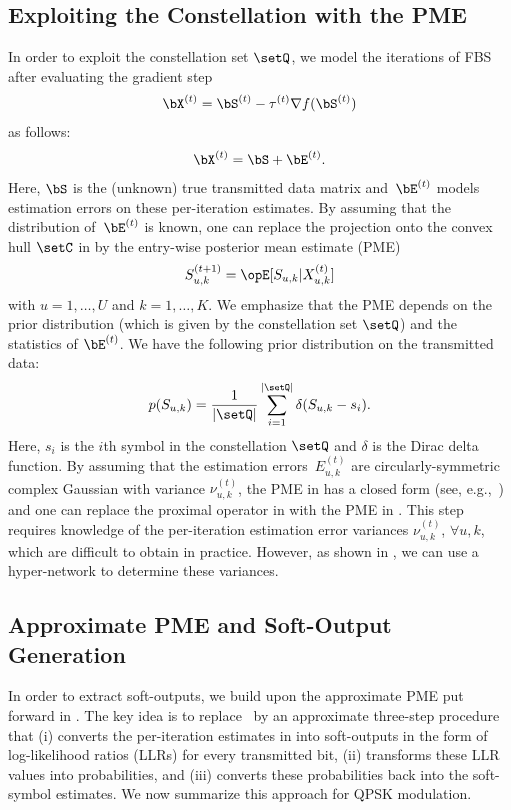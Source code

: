 \subsection{Exploiting the Constellation with the PME}\label{sec:posterior mean}
%
In order to exploit the constellation set $\setQ$, we model the iterations of FBS after evaluating the gradient step  
\begin{align} \label{eq:gradientstep}
\bX^{(t)} = \bS^{ (t) }- \tau^{(t)} \nabla f( \bS^{ (t) })
\end{align}
as follows: 
\begin{align}\label{eq:post equalized additive model}
\bX^{(t)}= \bS + \bE^{(t)}.
\end{align}
Here, $\bS$ is the (unknown) true transmitted data matrix and~$\bE^{(t)}$ models estimation errors on these per-iteration estimates. By assuming that the distribution of~$\bE^{(t)}$ is known, one can replace the projection onto the convex hull $\setC$ in  by the entry-wise posterior mean estimate (PME)
\begin{align} \label{eq:PME}
S_{u,k}^{(t+1)} = \Exop[ S_{u,k}| X_{u,k}^{(t)}]
\end{align}
with $u=1,\ldots,U$ and $k=1,\ldots,K$. We emphasize that the PME depends on the prior distribution (which is given by the constellation set $\setQ$) and the statistics of $\bE^{(t)}$. 
%
We have the following prior distribution on the transmitted data:
\begin{align}
p(S_{u,k}) = \frac{1}{|\setQ|}\sum_{i=1}^{|\setQ|} \delta(S_{u,k}-s_i).
\end{align}
Here, $s_i$ is the $i$th symbol in the constellation $\setQ$ and $\delta$ is the Dirac delta function. 
%
By assuming that the estimation errors~$E^{(t)}_{u,k}$ are circularly-symmetric complex Gaussian with variance $\nu_{u,k}^{(t)}$, the PME in  has a closed form (see, e.g.,~\cite{jeonOptimality2015}) and one can replace the proximal operator in  with the PME in .
%
This step requires knowledge of the per-iteration estimation error variances $\nu_{u,k}^{(t)}$, $\forall u,k$, which are difficult to obtain in practice. However, as shown in , we can use a hyper-network to determine these variances. 


\subsection{Approximate PME and Soft-Output Generation}
\label{sec:approxsoftoutputtrick}
%
In order to extract soft-outputs, we build upon the approximate PME put forward in \cite{jeonMismatched2020,jeon3542019}. 
%
The key idea is to replace~ by an approximate three-step procedure that (i) converts the per-iteration estimates in  into soft-outputs in the form of log-likelihood ratios (LLRs) for every transmitted bit, (ii) transforms these LLR values into probabilities, and (iii) converts these probabilities back into the soft-symbol estimates. 
%
We now summarize this approach for QPSK modulation. 

